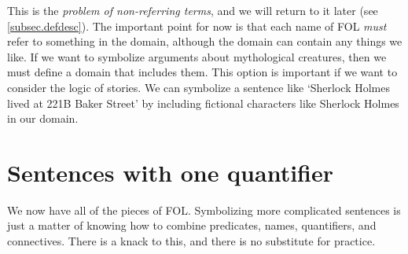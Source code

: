 This is the \emph{problem of non-referring terms}, and we will return to it later (see \cref{subsec.defdesc}). The important point for now is that each name of FOL \emph{must} refer to something in the domain, although the domain can contain any things we like. If we want to symbolize arguments about mythological creatures, then we must define a domain that includes them. This option is important if we want to consider the logic of stories. We can symbolize a sentence like `Sherlock Holmes lived at 221B Baker Street' by including fictional characters like Sherlock Holmes in our domain.

\chapter{Sentences with one quantifier}
\label{s:MoreMonadic}

We now have all of the pieces of FOL. Symbolizing more complicated sentences is just a matter of knowing how to combine predicates, names, quantifiers, and connectives. There is a knack to this, and there is no substitute for practice.

